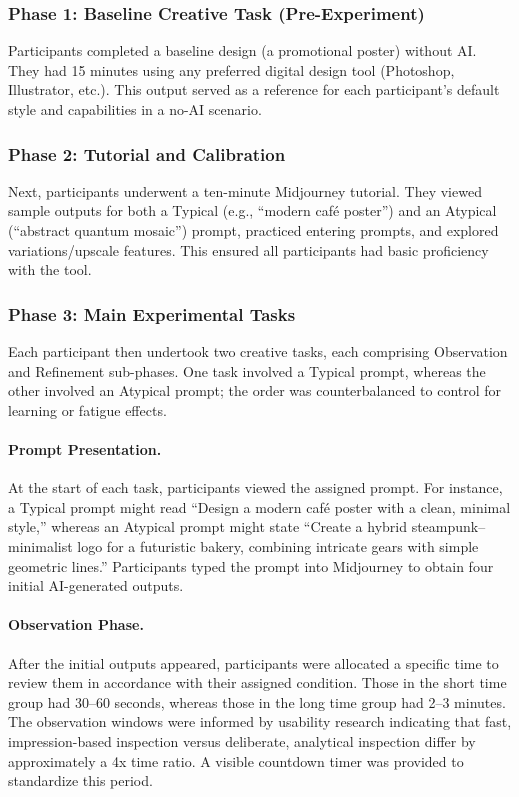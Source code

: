 \documentclass[letterpaper]{article} %
\begin{document}
\subsubsection{Phase 1: Baseline Creative Task (Pre-Experiment)}
Participants completed a baseline design (a promotional poster) without AI. They had 15 minutes using any preferred digital design tool (Photoshop, Illustrator, etc.). This output served as a reference for each participant’s default style and capabilities in a no-AI scenario.

\subsubsection{Phase 2: Tutorial and Calibration}
Next, participants underwent a ten-minute Midjourney tutorial. They viewed sample outputs for both a Typical (e.g., “modern café poster”) and an Atypical (“abstract quantum mosaic”) prompt, practiced entering prompts, and explored variations/upscale features. This ensured all participants had basic proficiency with the tool.

\subsubsection{Phase 3: Main Experimental Tasks}
Each participant then undertook two creative tasks, each comprising Observation and Refinement sub-phases. One task involved a Typical prompt, whereas the other involved an Atypical prompt; the order was counterbalanced to control for learning or fatigue effects.

\paragraph{Prompt Presentation.} At the start of each task, participants viewed the assigned prompt. For instance, a Typical prompt might read “Design a modern café poster with a clean, minimal style,” whereas an Atypical prompt might state “Create a hybrid steampunk–minimalist logo for a futuristic bakery, combining intricate gears with simple geometric lines.” Participants typed the prompt into Midjourney to obtain four initial AI-generated outputs.

\paragraph{Observation Phase.} After the initial outputs appeared, participants were allocated a specific time to review them in accordance with their assigned condition. Those in the short time group had 30–60 seconds, whereas those in the long time group had 2–3 minutes. The observation windows were informed by usability research indicating that fast, impression-based inspection versus deliberate, analytical inspection differ by approximately a 4x time ratio. A visible countdown timer was provided to standardize this period.
\end{document}
